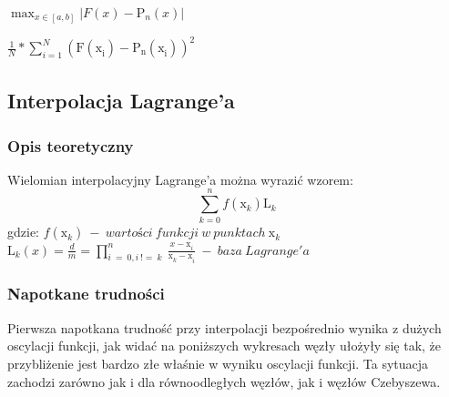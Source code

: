 \documentclass{article}
\begin{document}
\begin{center}
    \(\max_{x\in [a, b]} |F(x) - \mathrm{P}_{n}^{}(x)|\)
\end{center}

\begin{center}
\(\frac{1}{N} * \sum_{i = 1}^{N}\mathrm{(F(\mathrm{x}_{i}^{}) - \mathrm{P}_{n}^{}(\mathrm{x}_{i}^{}))}_{}^{2}\)
\end{center}

\newpage

\subsection{Interpolacja Lagrange'a}

\subsubsection{Opis teoretyczny}

Wielomian interpolacyjny Lagrange'a można wyrazić wzorem:
\[\sum_{k=0}^{n} f(\mathrm{x}_{k}^{})\mathrm{L}_{k}^{}\]
gdzie:
\bigbreak
\( f(\mathrm{x}_{k}^{})\ -\ wartości\ funkcji\ w\ punktach\ \mathrm{x}_{k}^{} \)
\bigbreak
\( \mathrm{L}_{k}^{}(x) = \frac{d}{m} = \prod_{i\ =\ 0, i\ !=\ k}^{n}\ \frac{x -\mathrm{x}_{i}^{}}{\mathrm{x}_{k}^{} - \mathrm{x}_{i}^{}}\ - \ baza\ Lagrange'a\)

\subsubsection{Napotkane trudności}

Pierwsza napotkana trudność przy interpolacji bezpośrednio wynika z dużych oscylacji funkcji, jak widać na poniższych wykresach węzły ułożyły się tak, że przybliżenie jest bardzo złe właśnie w wyniku oscylacji funkcji. Ta sytuacja zachodzi zarówno jak i dla równoodległych węzłów, jak i węzłów Czebyszewa.
\end{document}
